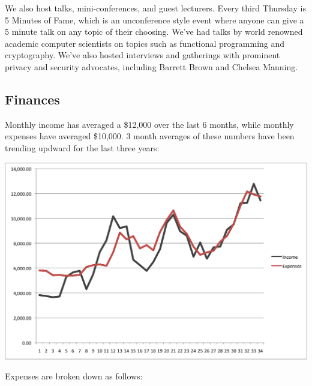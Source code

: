 \documentclass[12pt]{article}
\begin{document}
We also host talks, mini-conferences, and guest lecturers. Every third Thursday is 5 Minutes of Fame, which is an unconference style event where anyone can give a 5 minute talk on any topic of their choosing. We've had talks by world renowned academic computer scientists on topics such as functional programming and cryptography. We've also hosted interviews and gatherings with prominent privacy and security advocates, including Barrett Brown and Chelsea Manning.



\subsection{Finances}

Monthly income has averaged a \$12,000 over the last 6 months, while monthly expenses have averaged \$10,000. 3 month averages of these numbers have been trending updward for the last three years:

\includegraphics[height=45ex]{Finances.png}

Expenses are broken down as follows:
\end{document}

